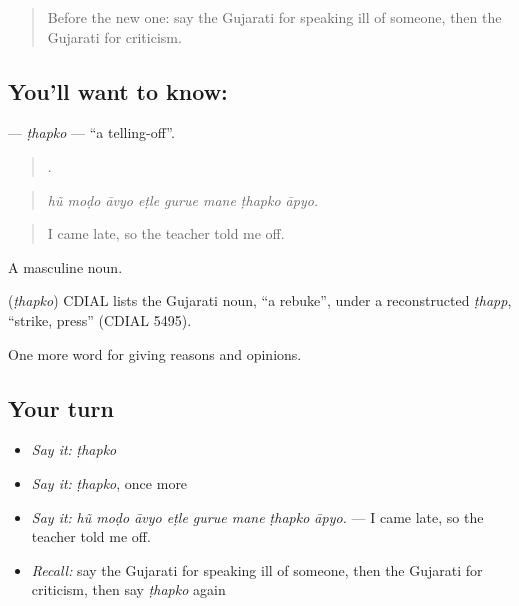 \label{lesson:GU-C361-thapko}



\begin{quote}
Before the new one: say the Gujarati for speaking ill of someone, then the Gujarati for criticism.
\end{quote}

\subsection*{You'll want to know: }
\textbf{} — \emph{ṭhapko} — \textquotedblleft{}a telling-off\textquotedblright{}.

\begin{quote}
       .
\end{quote}

\begin{quote}
\emph{hũ moḍo āvyo eṭle gurue mane ṭhapko āpyo.}
\end{quote}

\begin{quote}
I came late, so the teacher told me off.
\end{quote}

A masculine noun.

\begin{cousinweb}
\textbf{} (\emph{ṭhapko}) CDIAL lists the Gujarati noun, \textquotedblleft{}a rebuke\textquotedblright{}, under a reconstructed \emph{ṭhapp}, \textquotedblleft{}strike, press\textquotedblright{} (CDIAL 5495).
\end{cousinweb}

\begin{grammarlens}[title={What you've built}]
One more word for giving reasons and opinions.
\end{grammarlens}

\subsection*{Your turn}
\begin{itemize}
\raggedright
  \item \emph{Say it:} \emph{ṭhapko}
  \item \emph{Say it:} \emph{ṭhapko}, once more
  \item \emph{Say it:} \emph{hũ moḍo āvyo eṭle gurue mane ṭhapko āpyo.} — I came late, so the teacher told me off.
  \item \emph{Recall:} say the Gujarati for speaking ill of someone, then the Gujarati for criticism, then say \emph{ṭhapko} again
\end{itemize}

